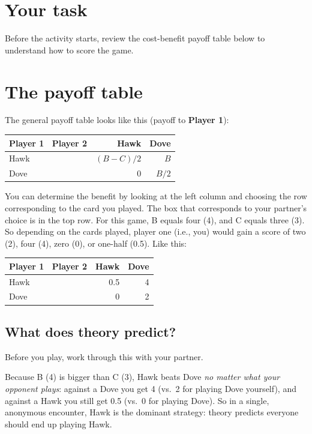 \documentclass[
  a4paper]{book}
\newcounter{none} %
\begin{document}
\section{Your task}\label{your-task-21}

Before the activity starts, review the cost-benefit payoff table below to understand how to score the game.

\section{The payoff table}\label{the-payoff-table}

The general payoff table looks like this (payoff to \textbf{Player 1}):

{\def\LTcaptype{none} %
\begin{longtable}[]{@{}lrr@{}}
\toprule\noalign{}
Player 1 ~Player 2 & Hawk & Dove \\
\midrule\noalign{}
\endhead
\bottomrule\noalign{}
\endlastfoot
Hawk & \((B-C)/2\) & \(B\) \\
Dove & \(0\) & \(B/2\) \\
\end{longtable}
}

You can determine the benefit by looking at the left column and choosing the row corresponding to the card you played. The box that corresponds to your partner's choice is in the top row. For this game, B equals four (4), and C equals three (3). So depending on the cards played, player one (i.e., you) would gain a score of two (2), four (4), zero (0), or one-half (0.5). Like this:

{\def\LTcaptype{none} %
\begin{longtable}[]{@{}lrr@{}}
\toprule\noalign{}
Player 1 ~Player 2 & Hawk & Dove \\
\midrule\noalign{}
\endhead
\bottomrule\noalign{}
\endlastfoot
Hawk & 0.5 & 4 \\
Dove & 0 & 2 \\
\end{longtable}
}

\subsection{What does theory predict?}\label{what-does-theory-predict}

Before you play, work through this with your partner.

Because B (4) is bigger than C (3), Hawk beats Dove \emph{no matter what your opponent plays}: against a Dove you get 4 (vs.~2 for playing Dove yourself), and against a Hawk you still get 0.5 (vs.~0 for playing Dove). So in a single, anonymous encounter, Hawk is the dominant strategy: theory predicts everyone should end up playing Hawk.
\end{document}
